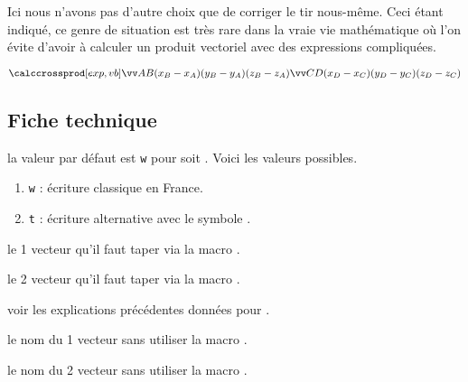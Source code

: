 \documentclass[12pt,a4paper]{article}
\begin{document}
Ici nous n'avons pas d'autre choix que de corriger le tir nous-même.
Ceci étant indiqué, ce genre de situation est très rare dans la vraie vie mathématique où l'on évite d'avoir à calculer un produit vectoriel avec des expressions compliquées.
    
\begin{latexex}
$\vcalccrossprod[exp,vb]%
 {AB}%
 {(x_B - x_A)}{(y_B - y_A)}{(z_B - z_A)}%
 {CD}%
 {(x_D - x_C)}{(y_D - y_C)}{(z_D - z_C)}$
\end{latexex}




\subsection{Fiche technique}


\IDoption{} la valeur par défaut est \verb+w+ pour  soit . Voici les valeurs possibles.

\begin{enumerate}
	\item \verb+w+ : écriture classique en France.

	\item \verb+t+ : écriture alternative avec le symbole .

\end{enumerate}

 le 1\ier{} vecteur qu'il faut taper via la macro .

 le 2\ieme{} vecteur qu'il faut taper via la macro .


\separation


 \hfill {}

\IDoption{} voir les explications précédentes données pour .

 le nom du 1\ier{} vecteur sans utiliser la macro .

 le nom du 2\ieme{} vecteur sans utiliser la macro .


\separation


  \hfill {}
\end{document}
